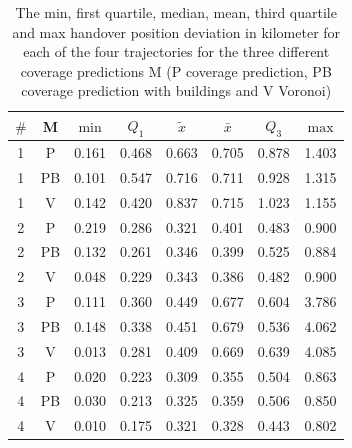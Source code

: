 \documentclass[twocolumn]{bmcart}%
\begin{document}
\begin{backmatter}
	\begin{table}[h]
		\caption{The min, first quartile, median, mean, third quartile and max handover position deviation in kilometer for each of the four trajectories for the three different coverage predictions M (P coverage prediction, PB coverage prediction with buildings and V Voronoi)}
		\begin{tabular}{|c|c|c|c|c|c|c|c|}
			\hline
			\textbf{$\#$} & \textbf{M} & \textbf{$\min$} & \textbf{$Q_1$} & \textbf{$\tilde{x}$} & \textbf{$\bar{x}$} & \textbf{$Q_3$} & \textbf{$\max$} \\ \hline
			1             & P          & 0.161           & 0.468          & 0.663                & 0.705              & 0.878          & 1.403           \\ \hline
			1             & PB         & 0.101           & 0.547          & 0.716                & 0.711              & 0.928          & 1.315           \\ \hline
			1             & V          & 0.142           & 0.420          & 0.837                & 0.715              & 1.023          & 1.155           \\ \hline
			2             & P          & 0.219           & 0.286          & 0.321                & 0.401              & 0.483          & 0.900           \\ \hline
			2             & PB         & 0.132           & 0.261          & 0.346                & 0.399              & 0.525          & 0.884           \\ \hline
			2             & V          & 0.048           & 0.229          & 0.343                & 0.386              & 0.482          & 0.900           \\ \hline
			3             & P          & 0.111           & 0.360          & 0.449                & 0.677              & 0.604          & 3.786           \\ \hline
			3             & PB         & 0.148           & 0.338          & 0.451                & 0.679              & 0.536          & 4.062           \\ \hline
			3             & V          & 0.013           & 0.281          & 0.409                & 0.669              & 0.639          & 4.085           \\ \hline
			4             & P          & 0.020           & 0.223          & 0.309                & 0.355              & 0.504          & 0.863           \\ \hline
			4             & PB         & 0.030           & 0.213          & 0.325                & 0.359              & 0.506          & 0.850           \\ \hline
			4             & V          & 0.010           & 0.175          & 0.321                & 0.328              & 0.443          & 0.802           \\ \hline
		\end{tabular}
		\label{table:handover}
	\end{table}
	

\end{backmatter}
\end{document}

